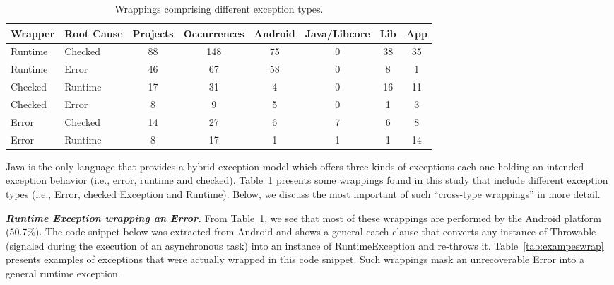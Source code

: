 \begin{table}
\scriptsize
  \centering
  \begin{tabular}{llcccccc}
    \hline
    \bfseries{Wrapper}  &  \bfseries{Root Cause} &  \bfseries{Projects}  &  \bfseries{Occurrences} & \textsf{Android} & \textsf{Java/Libcore} & \textsf{Lib} & \textsf{App}  \\
    \hline
      
      Runtime &  Checked   & 88 & 148 &  75 &  0   & 38 &  35 \\  %
      Runtime   &  Error      & 46  &  67    &  58  &  0   & 8  &  1   \\      %
      Checked &  Runtime   & 17  & 31 & 4 &  0  & 16  &  11 \\  %
      Checked & Error         & 8    &  9  & 5  &  0  &  1 &  3  \\
      Error & Checked         & 14  &  27 &  6  &  7  &  6 &   8    \\
      Error & Runtime        & 8      &  17   & 1 &  1  & 1 &  14    \\

  \hline
  \end{tabular}
\caption{Wrappings comprising different exception types.}
\label{tab:wrappingandroid}
\end{table}

Java is the only language that provides a hybrid exception model 
which offers three kinds of exceptions each one holding an intended exception behavior (i.e., error, 
runtime and checked). Table~\ref{tab:wrappingandroid} presents some wrappings found in this study that
include different exception types (i.e., Error, checked Exception and Runtime).
Below, we discuss the most
important of such ``cross-type wrappings'' in more detail.

\emph{\textbf{Runtime Exception wrapping an Error.}} 
From Table~\ref{tab:wrappingandroid}, we see that most of these wrappings	
are performed by the Android platform (50.7\%).
The code snippet below was extracted from Android and shows a general catch clause 
that converts any instance of Throwable (signaled during the execution
of an asynchronous task) into an instance of RuntimeException and re-throws it.  
Table~\ref{tab:exampeswrap} presents examples of exceptions that were actually wrapped in this code snippet.  
Such wrappings mask an unrecoverable Error into a general runtime exception.

